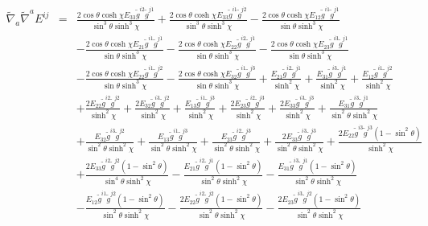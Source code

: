 \documentclass[10pt,letterpaper]{article}
\numberwithin{equation}{section}
\begin{document}
\begin{appendices}
\begin{eqnarray}
\end{eqnarray}
\begin{eqnarray}
\tilde\nabla_a\tilde\nabla^a E^{ij}&=& \frac{2 \cos\theta \cosh\chi E_{33} \tilde{g}^{i2} \tilde{g}^{j1}}{\sin^3\theta \sinh^3\chi} + \frac{2 \cos\theta \cosh\chi E_{33} \tilde{g}^{i1} \tilde{g}^{j2}}{\sin^3\theta \sinh^3\chi} -  \frac{2 \cos\theta \cosh\chi E_{12} \tilde{g}^{i1} \tilde{g}^{j1}}{\sin\theta \sinh^3\chi} \nonumber \\ 
&& -  \frac{2 \cos\theta \cosh\chi E_{21} \tilde{g}^{i1} \tilde{g}^{j1}}{\sin\theta \sinh^3\chi} -  \frac{2 \cos\theta \cosh\chi E_{22} \tilde{g}^{i2} \tilde{g}^{j1}}{\sin\theta \sinh^3\chi} -  \frac{2 \cos\theta \cosh\chi E_{23} \tilde{g}^{i3} \tilde{g}^{j1}}{\sin\theta \sinh^3\chi} \nonumber \\ 
&& -  \frac{2 \cos\theta \cosh\chi E_{22} \tilde{g}^{i1} \tilde{g}^{j2}}{\sin\theta \sinh^3\chi} -  \frac{2 \cos\theta \cosh\chi E_{32} \tilde{g}^{i1} \tilde{g}^{j3}}{\sin\theta \sinh^3\chi} + \frac{E_{21} \tilde{g}^{i2} \tilde{g}^{j1}}{\sinh^2\chi} + \frac{E_{31} \tilde{g}^{i3} \tilde{g}^{j1}}{\sinh^2\chi} + \frac{E_{12} \tilde{g}^{i1} \tilde{g}^{j2}}{\sinh^2\chi} \nonumber \\ 
&& + \frac{2 E_{22} \tilde{g}^{i2} \tilde{g}^{j2}}{\sinh^2\chi} + \frac{2 E_{32} \tilde{g}^{i3} \tilde{g}^{j2}}{\sinh^2\chi} + \frac{E_{13} \tilde{g}^{i1} \tilde{g}^{j3}}{\sinh^2\chi} + \frac{2 E_{23} \tilde{g}^{i2} \tilde{g}^{j3}}{\sinh^2\chi} + \frac{2 E_{33} \tilde{g}^{i3} \tilde{g}^{j3}}{\sinh^2\chi} + \frac{E_{31} \tilde{g}^{i3} \tilde{g}^{j1}}{\sin^2\theta \sinh^2\chi} \nonumber \\ 
&& + \frac{E_{32} \tilde{g}^{i3} \tilde{g}^{j2}}{\sin^2\theta \sinh^2\chi} + \frac{E_{13} \tilde{g}^{i1} \tilde{g}^{j3}}{\sin^2\theta \sinh^2\chi} + \frac{E_{23} \tilde{g}^{i2} \tilde{g}^{j3}}{\sin^2\theta \sinh^2\chi} + \frac{2 E_{33} \tilde{g}^{i3} \tilde{g}^{j3}}{\sin^2\theta \sinh^2\chi} + \frac{2 E_{22} \tilde{g}^{i3} \tilde{g}^{j3} (1 -  \sin^2\theta)}{\sinh^2\chi} \nonumber \\ 
&& + \frac{2 E_{33} \tilde{g}^{i2} \tilde{g}^{j2} (1 -  \sin^2\theta)}{\sin^4\theta \sinh^2\chi} -  \frac{E_{21} \tilde{g}^{i2} \tilde{g}^{j1} (1 -  \sin^2\theta)}{\sin^2\theta \sinh^2\chi} -  \frac{E_{31} \tilde{g}^{i3} \tilde{g}^{j1} (1 -  \sin^2\theta)}{\sin^2\theta \sinh^2\chi} \nonumber \\ 
&& -  \frac{E_{12} \tilde{g}^{i1} \tilde{g}^{j2} (1 -  \sin^2\theta)}{\sin^2\theta \sinh^2\chi} -  \frac{2 E_{22} \tilde{g}^{i2} \tilde{g}^{j2} (1 -  \sin^2\theta)}{\sin^2\theta \sinh^2\chi} -  \frac{2 E_{23} \tilde{g}^{i3} \tilde{g}^{j2} (1 -  \sin^2\theta)}{\sin^2\theta \sinh^2\chi} \nonumber \\ 

\end{eqnarray}
\end{appendices}
\end{document}
